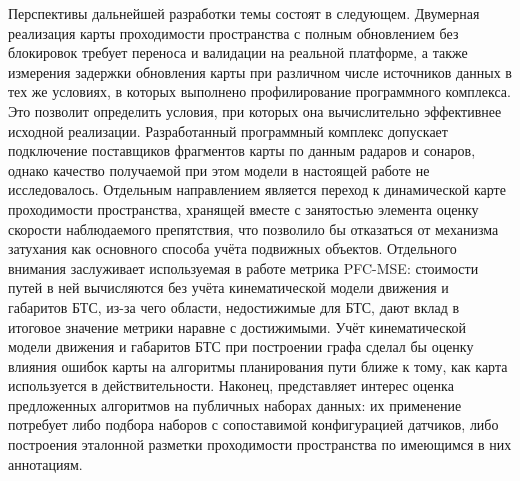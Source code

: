 Перспективы дальнейшей разработки темы состоят в следующем. Двумерная реализация карты проходимости пространства с полным обновлением без блокировок требует переноса и валидации на реальной платформе, а также измерения задержки обновления карты при различном числе источников данных в тех же условиях, в которых выполнено профилирование программного комплекса. Это позволит определить условия, при которых она вычислительно эффективнее исходной реализации. Разработанный программный комплекс допускает подключение поставщиков фрагментов карты по данным радаров и сонаров, однако качество получаемой при этом модели в настоящей работе не исследовалось. Отдельным направлением является переход к динамической карте проходимости пространства, хранящей вместе с занятостью элемента оценку скорости наблюдаемого препятствия, что позволило бы отказаться от механизма затухания как основного способа учёта подвижных объектов. Отдельного внимания заслуживает используемая в работе метрика PFC-MSE: стоимости путей в ней вычисляются без учёта кинематической модели движения и габаритов БТС, из-за чего области, недостижимые для БТС, дают вклад в итоговое значение метрики наравне с достижимыми. Учёт кинематической модели движения и габаритов БТС при построении графа сделал бы оценку влияния ошибок карты на алгоритмы планирования пути ближе к тому, как карта используется в действительности. Наконец, представляет интерес оценка предложенных алгоритмов на публичных наборах данных: их применение потребует либо подбора наборов с сопоставимой конфигурацией датчиков, либо построения эталонной разметки проходимости пространства по имеющимся в них аннотациям.
